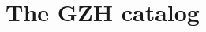 \documentclass[twocolumn]{aastex6}
\begin{document}


%
%
%
%
%
%
%

\section{The GZH catalog}\label{sec:results}
\end{document}
